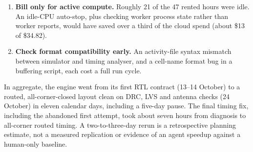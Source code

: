 \begin{enumerate}
\item \textbf{Bill only for active compute.} Roughly 21 of the 47 rented hours were idle. An idle-CPU auto-stop, plus checking worker process state rather than worker reports, would have saved over a third of the cloud spend (about \$13 of \$34.82).
\item \textbf{Check format compatibility early.} An activity-file syntax mismatch between simulator and timing analyser, and a cell-name format bug in a buffering script, each cost a full run cycle.
\end{enumerate}

In aggregate, the engine went from its first RTL contract (13--14 October) to a routed, all-corner-closed layout clean on DRC, LVS and antenna checks (24 October) in eleven calendar days, including a five-day pause. The final timing fix, including the abandoned first attempt, took about seven hours from diagnosis to all-corner routed timing.
A two-to-three-day rerun is a retrospective planning estimate, not a measured replication or evidence of an agent speedup against a human-only baseline.

